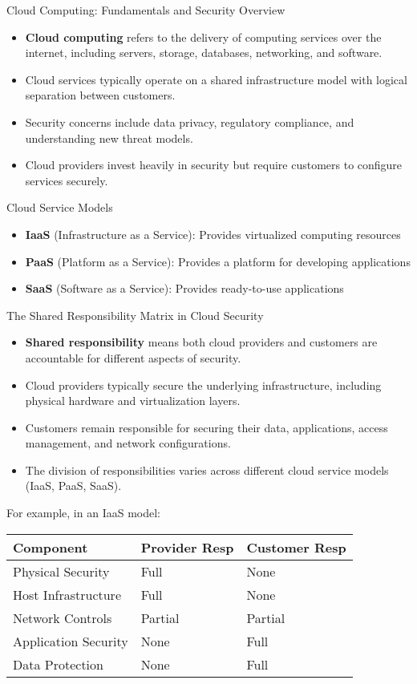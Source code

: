 \documentclass{beamer}
\begin{document}
\begin{frame}{Cloud Computing: Fundamentals and Security Overview}
\begin{itemize}
\item \textbf{Cloud computing} refers to the delivery of computing services over the internet, including servers, storage, databases, networking, and software.
\item Cloud services typically operate on a shared infrastructure model with logical separation between customers.
\item Security concerns include data privacy, regulatory compliance, and understanding new threat models.
\item Cloud providers invest heavily in security but require customers to configure services securely.
\end{itemize}

\begin{block}{Cloud Service Models}
\begin{itemize}
\item \textbf{IaaS} (Infrastructure as a Service): Provides virtualized computing resources
\item \textbf{PaaS} (Platform as a Service): Provides a platform for developing applications
\item \textbf{SaaS} (Software as a Service): Provides ready-to-use applications
\end{itemize}
\end{block}
\end{frame}

\begin{frame}{The Shared Responsibility Matrix in Cloud Security}
\begin{itemize}
\item \textbf{Shared responsibility} means both cloud providers and customers are accountable for different aspects of security.
\item Cloud providers typically secure the underlying infrastructure, including physical hardware and virtualization layers.
\item Customers remain responsible for securing their data, applications, access management, and network configurations.
\item The division of responsibilities varies across different cloud service models (IaaS, PaaS, SaaS). 
\end{itemize}
For example, in an IaaS model:
\begin{table}
\begin{tabular}{lll}
\toprule
\textbf{Component} & \textbf{Provider Resp} & \textbf{Customer Resp} \\
\midrule
Physical Security & Full & None \\
Host Infrastructure & Full & None \\
Network Controls & Partial & Partial \\
Application Security & None & Full \\
Data Protection & None & Full \\
\bottomrule
\end{tabular}
\end{table}
\end{frame}
\end{document}
